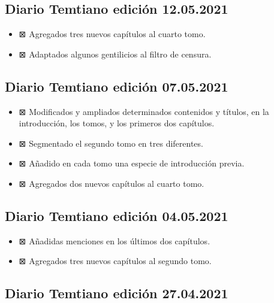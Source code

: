 \documentclass[
]{book}
\begin{document}
\hypertarget{diario-temtiano-ediciuxf3n-12.05.2021}{%
\subsection*{Diario Temtiano edición 12.05.2021}\label{diario-temtiano-ediciuxf3n-12.05.2021}}

\begin{itemize}
\item
  ⊠ Agregados tres nuevos capítulos al cuarto tomo.
\item
  ⊠ Adaptados algunos gentilicios al filtro de censura.
\end{itemize}

\hypertarget{diario-temtiano-ediciuxf3n-07.05.2021}{%
\subsection*{Diario Temtiano edición 07.05.2021}\label{diario-temtiano-ediciuxf3n-07.05.2021}}

\begin{itemize}
\item
  ⊠ Modificados y ampliados determinados contenidos y títulos, en la introducción, los tomos, y los primeros dos capítulos.
\item
  ⊠ Segmentado el segundo tomo en tres diferentes.
\item
  ⊠ Añadido en cada tomo una especie de introducción previa.
\item
  ⊠ Agregados dos nuevos capítulos al cuarto tomo.
\end{itemize}

\hypertarget{diario-temtiano-ediciuxf3n-04.05.2021}{%
\subsection*{Diario Temtiano edición 04.05.2021}\label{diario-temtiano-ediciuxf3n-04.05.2021}}

\begin{itemize}
\item
  ⊠ Añadidas menciones en los últimos dos capítulos.
\item
  ⊠ Agregados tres nuevos capítulos al segundo tomo.
\end{itemize}

\hypertarget{diario-temtiano-ediciuxf3n-27.04.2021}{%
\subsection*{Diario Temtiano edición 27.04.2021}\label{diario-temtiano-ediciuxf3n-27.04.2021}}
\end{document}
